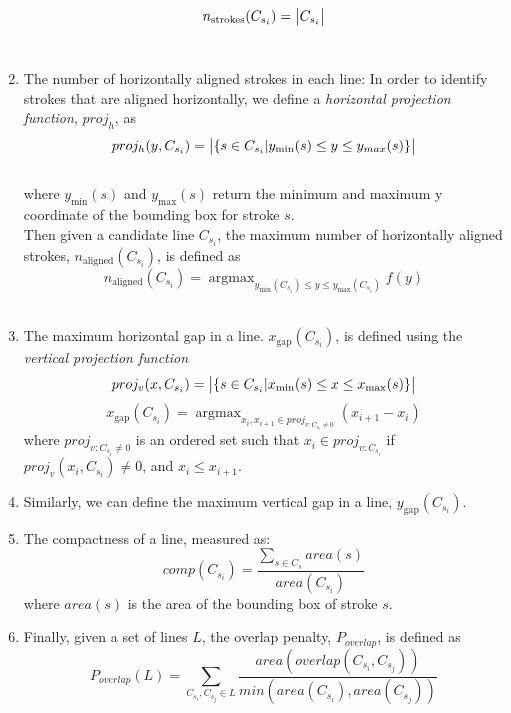 \documentclass{article}
\DeclareMathOperator*{\argmax}{argmax}
\begin{document}
\begin{enumerate}
\begin{equation}
n_\text{strokes}(C_{s_i}) = \big{|}C_{s_i}\big{|}
\end{equation}\\
\item The number of horizontally aligned strokes in each line: In order to identify strokes that are aligned horizontally, we define a \textit{horizontal projection function}, $proj_h$, as\\
\begin{equation}
proj_h(y, C_{s_i}) = \big{|}\{s\in C_{s_i} \small{|} y_\text{min}(s)\le y \le y_{max}(s) \}\big{|}
\end{equation}\\
where $y_\text{min}(s)$ and $y_\text{max}(s)$ return the minimum and maximum y coordinate of the bounding box for stroke $s$. \\
Then given a candidate line $C_{s_i}$, the maximum number of horizontally aligned strokes, $n_\text{aligned}(C_{s_i})$, is defined as
\begin{equation}
n_\text{aligned}(C_{s_i}) = \argmax_{y_\text{min}(C_{s_i}) \le y \le y_\text{max}(C_{s_i})} f(y)
\end{equation}\\
\item
The maximum horizontal gap in a line. $x_\text{gap}(C_{s_i})$, is defined using the \textit{vertical projection function}
\begin{equation}
proj_v(x, C_{s_i}) = \big|\{s \in C_{s_i} \small| x_\text{min}(s) \le x \le x_\text{max}(s)\}\big|
\end{equation}
\begin{equation}
x_\text{gap}(C_{s_i}) = \argmax_{x_i, x_{i+1} \in proj_{v:C_{s_i} \ne 0}} (x_{i+1} - x_i)
\end{equation}
where $proj_{v:C_{s_i} \ne 0}$ is an ordered set such that $x_{i} \in proj_{v:C_{s_i}}$ if $proj_v(x_{i}, C_{s_i}) \ne 0$, and $x_i \le x_{i+1}$.\\
\item
Similarly, we can define the maximum vertical gap in a line, $y_\text{gap}(C_{s_i})$.
\item The compactness of a line, measured as:
\begin{equation}
comp(C_{s_i}) = \frac{\sum\limits_{s\in C_s}area(s)}{area(C_{s_i})}
\end{equation}
where $area(s)$ is the area of the bounding box of stroke $s$.
\item Finally, given a set of lines $L$, the overlap penalty, $P_{overlap}$, is defined as
\begin{equation}
P_{overlap}(L) = \sum \limits_{C_{s_i}, C_{s_j} \in L} \frac{area(overlap(C_{s_i}, C_{s_j}))}{min(area(C_{s_i}), area(C_{s_j}))}
\end{equation}
\end{enumerate}
\end{document}
